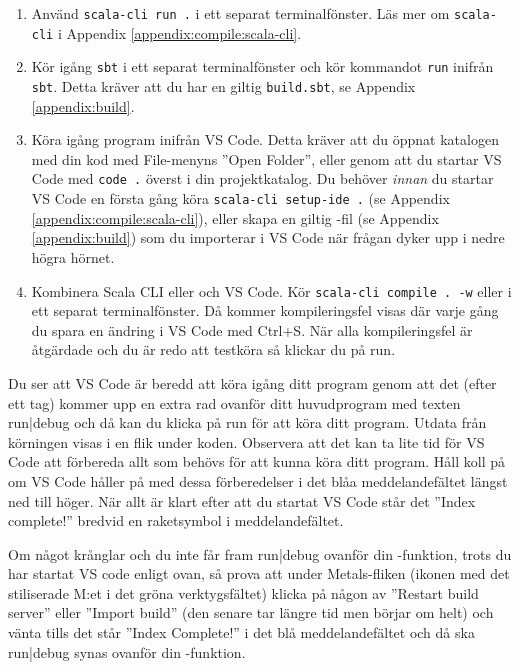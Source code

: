 \begin{enumerate}
  \item Använd \texttt{scala-cli run .} i ett separat terminalfönster. Läs mer om \texttt{scala-cli} i Appendix \ref{appendix:compile:scala-cli}.
  \item Kör igång \texttt{sbt} i ett separat terminalfönster och kör kommandot \texttt{run} inifrån \texttt{sbt}. Detta kräver att du har en giltig \texttt{build.sbt}, se Appendix \ref{appendix:build}.
  \item Köra igång program inifrån VS Code. Detta kräver att du öppnat katalogen med din kod med File-menyns ''Open Folder'', eller genom att du startar VS Code med \texttt{code .} överst i din projektkatalog. Du behöver \textit{innan} du startar VS Code en första gång köra \texttt{scala-cli setup-ide .} (se Appendix \ref{appendix:compile:scala-cli}), eller skapa en giltig -fil (se Appendix \ref{appendix:build}) som du importerar i VS Code när frågan dyker upp i nedre högra hörnet.
  \item Kombinera Scala CLI eller  och VS Code. Kör  \texttt{scala-cli compile . -w} eller  i ett separat terminalfönster. Då kommer kompileringsfel visas där varje gång du spara en ändring i VS Code med Ctrl+S. När alla kompileringsfel är åtgärdade och du är redo att testköra så klickar du på \textsf{run}.
\end{enumerate}

Du ser att VS Code är beredd att köra igång ditt program genom att det (efter ett tag) kommer upp en extra rad ovanför ditt huvudprogram med texten \textsf{run|debug} och då kan du klicka på \textsf{run} för att köra ditt program. Utdata från körningen visas i en flik under koden. Observera att det kan ta lite tid för VS Code att förbereda allt som behövs för att kunna köra ditt program. Håll koll på om VS Code håller på med dessa förberedelser i det blåa meddelandefältet längst ned till höger. När allt är klart efter att du startat VS Code står det ''Index complete!'' bredvid en raketsymbol i meddelandefältet.

Om något krånglar och du inte får fram \textsf{run|debug} ovanför din -funktion, trots du har startat VS code enligt ovan, så prova att under Metals-fliken (ikonen med det stiliserade M:et i det gröna verktygsfältet) klicka på någon av ''Restart build server'' eller ''Import build'' (den senare tar längre tid men börjar om helt) och vänta tills det står ''Index Complete!'' i det blå meddelandefältet och då ska \textsf{run|debug} synas ovanför din -funktion.


